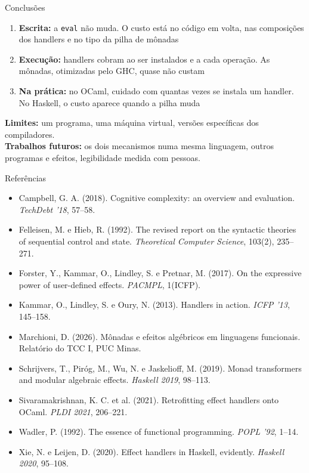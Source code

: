 \documentclass[aspectratio=169,10pt,xcolor={table}]{beamer}
\newcommand{\oc}[1]{\textcolor{marinho}{#1}}
\newcommand{\hs}[1]{\textcolor{rosa}{#1}}
\begin{document}
\begin{frame}{Conclusões}
  \begin{enumerate}
    \item \textbf{Escrita:} a \texttt{eval} não muda. O custo está no código em volta, nas composições dos \oc{handlers} e no tipo da pilha de \hs{mônadas}
    \item \textbf{Execução:} handlers cobram ao ser instalados e a cada operação. As mônadas, otimizadas pelo GHC, quase não custam
    \item \textbf{Na prática:} no OCaml, cuidado com quantas vezes se instala um handler. No Haskell, o custo aparece quando a pilha muda
  \end{enumerate}
  \vskip4mm
  \textbf{Limites:} um programa, uma máquina virtual, versões específicas dos compiladores.\\[1mm]
  \textbf{Trabalhos futuros:} os dois mecanismos numa mesma linguagem, outros programas e efeitos, legibilidade medida com pessoas.
\end{frame}

\begin{frame}{Referências}
  \fontsize{8}{10.5}\selectfont
  \begin{itemize}
    \item Campbell, G. A. (2018). Cognitive complexity: an overview and evaluation. \emph{TechDebt '18}, 57--58.
    \item Felleisen, M. e Hieb, R. (1992). The revised report on the syntactic theories of sequential control and state. \emph{Theoretical Computer Science}, 103(2), 235--271.
    \item Forster, Y., Kammar, O., Lindley, S. e Pretnar, M. (2017). On the expressive power of user-defined effects. \emph{PACMPL}, 1(ICFP).
    \item Kammar, O., Lindley, S. e Oury, N. (2013). Handlers in action. \emph{ICFP '13}, 145--158.
    \item Marchioni, D. (2026). Mônadas e efeitos algébricos em linguagens funcionais. Relatório do TCC I, PUC Minas.
    \item Schrijvers, T., Piróg, M., Wu, N. e Jaskelioff, M. (2019). Monad transformers and modular algebraic effects. \emph{Haskell 2019}, 98--113.
    \item Sivaramakrishnan, K. C. et al. (2021). Retrofitting effect handlers onto OCaml. \emph{PLDI 2021}, 206--221.
    \item Wadler, P. (1992). The essence of functional programming. \emph{POPL '92}, 1--14.
    \item Xie, N. e Leijen, D. (2020). Effect handlers in Haskell, evidently. \emph{Haskell 2020}, 95--108.
  \end{itemize}
\end{frame}
\end{document}
